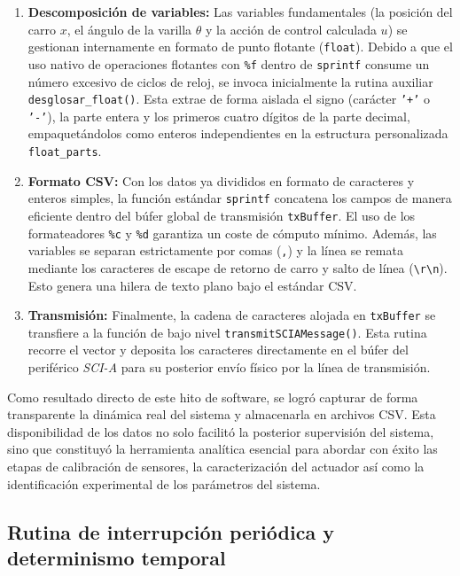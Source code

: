 \documentclass[11pt,fleqn]{book} %
\begin{document}
\begin{enumerate}
	\item \textbf{Descomposición de variables:} Las variables fundamentales (la posición del carro $x$, el ángulo de la varilla $\theta$ y la acción de control calculada $u$) se gestionan internamente en formato de punto flotante (\texttt{float}). Debido a que el uso nativo de operaciones flotantes con \texttt{\%f} dentro de \texttt{sprintf} consume un número excesivo de ciclos de reloj, se invoca inicialmente la rutina auxiliar \texttt{desglosar\_float()}. Esta extrae de forma aislada el signo (carácter \texttt{'+'} o \texttt{'-'}), la parte entera y los primeros cuatro dígitos de la parte decimal, empaquetándolos como enteros independientes en la estructura personalizada \texttt{float\_parts}.
	
	\item \textbf{Formato CSV:} Con los datos ya divididos en formato de caracteres y enteros simples, la función estándar \texttt{sprintf} concatena los campos de manera eficiente dentro del búfer global de transmisión \texttt{txBuffer}. El uso de los formateadores \texttt{\%c} y \texttt{\%d} garantiza un coste de cómputo mínimo. Además, las variables se separan estrictamente por comas (\texttt{,}) y la línea se remata mediante los caracteres de escape de retorno de carro y salto de línea (\texttt{\textbackslash r\textbackslash n}). Esto genera una hilera de texto plano bajo el estándar CSV.
	
	\item \textbf{Transmisión:} Finalmente, la cadena de caracteres alojada en \texttt{txBuffer} se transfiere a la función de bajo nivel \texttt{transmitSCIAMessage()}. Esta rutina recorre el vector y deposita los caracteres directamente en el búfer del periférico \textit{SCI-A} para su posterior envío físico por la línea de transmisión.
\end{enumerate}


Como resultado directo de este hito de software, se logró capturar de forma transparente la dinámica real del sistema y almacenarla en archivos CSV. Esta disponibilidad de los datos no solo facilitó la posterior supervisión del sistema, sino que constituyó la herramienta analítica esencial para abordar con éxito las etapas de calibración de sensores, la caracterización del actuador así como la identificación experimental de los parámetros del sistema.


\subsection{Rutina de interrupción periódica y determinismo temporal}
\label{ssec:interrupcion_periodica}
\end{document}
